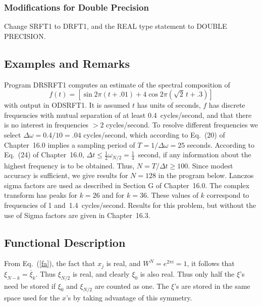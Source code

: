 \documentclass[twoside]{MATH77}
\begin{document}
\subsubsection{Modifications for Double Precision}

Change SRFT1 to DRFT1, and the REAL type statement to DOUBLE PRECISION.

\subsection{Examples and Remarks}

Program DRSRFT1 computes an estimate of the spectral composition of
\begin{equation}
\label{e1}f(t)=[\sin 2\pi (t+.01)+4\cos 2\pi (\sqrt{2}\,t+.3)]
\end{equation}
with output in ODSRFT1. It is assumed $t$ has units of seconds, $f$ has
discrete frequencies with mutual separation of at least 0.4~cycles/second,
and that there is no interest in frequencies $>2$ cycles/second. To resolve
different frequencies we select $\Delta \omega =0.4/10=.04$ cycles/second,
which according to Eq.~(20) of Chapter~16.0 implies a sampling period of $%
T=1/\Delta \omega =25$ seconds. According to Eq.~(24) of Chapter~16.0, $\Delta
t\leq \frac 12\omega _{N/2}=\frac 14$~second, if any information about the
highest frequency is to be obtained. Thus, $N=T/\Delta t\geq 100$. Since
modest accuracy is sufficient, we give results for $N=128$ in the program
below. Lanczos sigma factors are used as described in Section G of
Chapter~16.0. The complex transform has peaks for $k=26$ and for $k=36$.
These values of $k$ correspond to frequencies of 1 and~1.4~cycles/second.
Results for this problem, but without the use of Sigma factors are
given in Chapter~16.3.

\subsection{Functional Description}

From Eq.~(\ref{fa}), the fact that $x_j$ is real, and $W^N=e^{2\pi i}=1$, it
follows that $\xi _{N-k}=\overline{\xi }_k$. Thus $\xi _{N/2}$ is real, and
clearly $\xi _0$ is also real. Thus only half the $\xi $'s need be
stored if $\xi _0$ and $\xi _{N/2}$ are counted as one. The $\xi $'s
are stored in the same space used for the $x$'s by taking advantage
of this symmetry.
\end{document}
